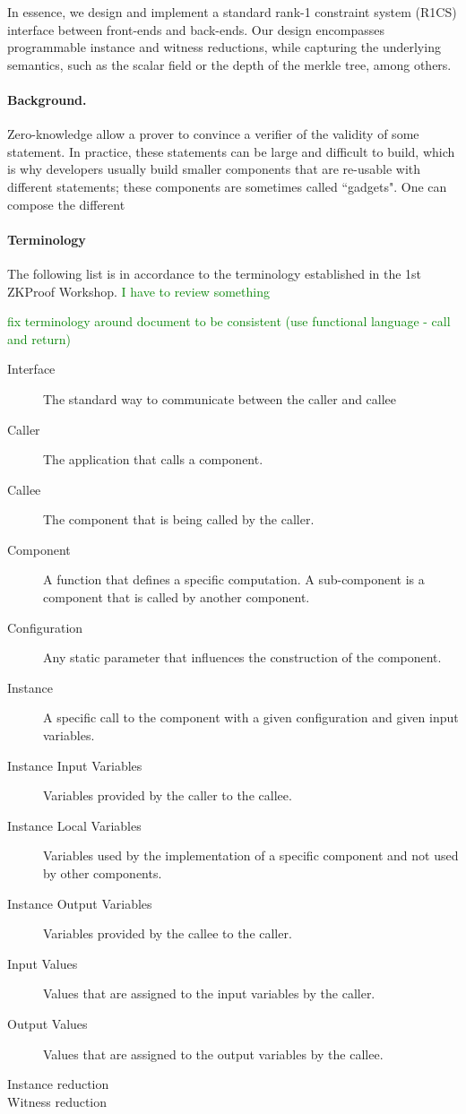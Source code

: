 \documentclass[a4paper,11pt]{article}
\newcommand\anote[1]{\textcolor{green}{#1}}
\newcommand\dtodo[1]{\todo[color=red!20]{#1}}
\begin{document}
		In essence, we design and implement a standard rank-1 constraint system (R1CS) interface between front-ends and back-ends. Our design encompasses programmable instance and witness reductions, while capturing the underlying semantics, such as the scalar field or the depth of the merkle tree, among others.

		\dtodo{Review the introduction}
		
		\paragraph{Background.} Zero-knowledge allow a prover to convince a verifier of the validity of some statement. In practice, these statements can be large and difficult to build, which is why developers usually build smaller components that are re-usable with different statements; these components are sometimes called ``gadgets". One can compose the different 
		
		
		\paragraph{Terminology}
		The following list is in accordance to the terminology established in the 1st ZKProof Workshop. \anote{I have to review something}
		
		\anote{fix terminology around document to be consistent (use functional language - call and return)}
		
		\begin{description}
			\item [Interface] The standard way to communicate between the caller and callee
			\item [Caller] The application that calls a component. 
			\item [Callee] The component that is being called by the caller.
			\item [Component] A function that defines a specific computation. A sub-component is a component that is called by another component.
			\item [Configuration] Any static parameter that influences the construction of the component. 
			\item [Instance] A specific call to the component with a given configuration and given input variables.
			\item [Instance Input Variables] Variables provided by the caller to the callee.
			\item [Instance Local Variables] Variables used by the implementation of a specific component and not used by other components.
			\item [Instance Output Variables] Variables provided by the callee to the caller.
			\item [Input Values] Values that are assigned to the input variables by the caller.
			\item [Output Values] Values that are assigned to the output variables by the callee.
			\item [Instance reduction]
			\item [Witness reduction]
		\end{description}
		
\end{document}
